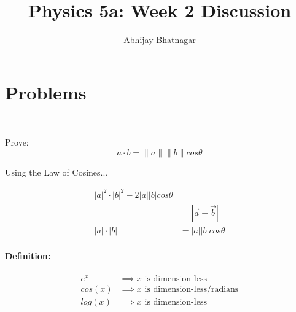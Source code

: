 \documentclass[11pt, notitlepage]{report}
\makeatletter
\newcommand{\abs}[1]{|#1|}
\newcommand{\ra}[1]{\overrightarrow{#1}}
\newenvironment{definition}{\paragraph{Definition:}}{\hfill}
\newenvironment{problem}[2][Problem]{\begin{trivlist}
	\item[\hskip \labelsep {\bfseries #1}\hskip \labelsep {\bfseries #2.}]}{\end{trivlist}}
\newcommand*{\toccontents}{\@starttoc{toc}}
\makeatother
\begin{document}
   \title{Physics 5a: Week 2 Discussion}
   \author{Abhijay Bhatnagar}
   \maketitle
   \toccontents



\setcounter{secnumdepth}{0} %
\section{Problems}

\begin{problem}{K\&K 1.4 esque}

\end{problem}

\begin{problem}{K\&K 1.5 esque}
	
\end{problem}


\begin{problem}{Law of Cosines Problem} \

	Prove: \begin{equation}
  a \cdot b = \|a\|\|b\|cos\theta
\end{equation}

Using the Law of Cosines...

	\begin{align*}
		|a|^2 \cdot \abs{b}^2 - 2|a||b|cos\theta \\ &= \abs{\ra{a}-\ra{b}} \\
		\abs{a} \cdot \abs{b} &= \abs{a}\abs{b}cos\theta
	\end{align*}

\end{problem}

\begin{problem}{sin problems}
	
\end{problem}

\begin{definition}
	\begin{align*}
	e^x &\implies \text{$x$ is dimension-less} \\
	cos(x) &\implies \text{$x$ is dimension-less/radians}\\
	log(x) &\implies \text{$x$ is dimension-less}	
	\end{align*}

\end{definition}
\end{document}
